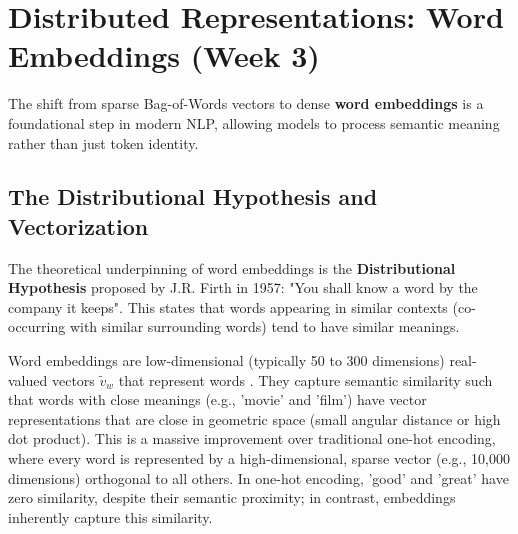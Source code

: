 \documentclass{article}
\begin{document}
\begin{table}[h!]
\centering
\caption{Softmax and Cross-Entropy Loss Synthesis}
\end{table}

\section{Distributed Representations: Word Embeddings (Week 3)}

The shift from sparse Bag-of-Words vectors to dense \textbf{word embeddings} is a foundational step in modern NLP, allowing models to process semantic meaning rather than just token identity.

\subsection{The Distributional Hypothesis and Vectorization}

The theoretical underpinning of word embeddings is the \textbf{Distributional Hypothesis} proposed by J.R. Firth in 1957: "You shall know a word by the company it keeps". This states that words appearing in similar contexts (co-occurring with similar surrounding words) tend to have similar meanings.

Word embeddings are low-dimensional (typically 50 to 300 dimensions) real-valued vectors $\tilde{v}_w$ that represent words . They capture semantic similarity such that words with close meanings (e.g., 'movie' and 'film') have vector representations that are close in geometric space (small angular distance or high dot product). This is a massive improvement over traditional one-hot encoding, where every word is represented by a high-dimensional, sparse vector (e.g., 10,000 dimensions) orthogonal to all others. In one-hot encoding, 'good' and 'great' have zero similarity, despite their semantic proximity; in contrast, embeddings inherently capture this similarity.
\end{document}
